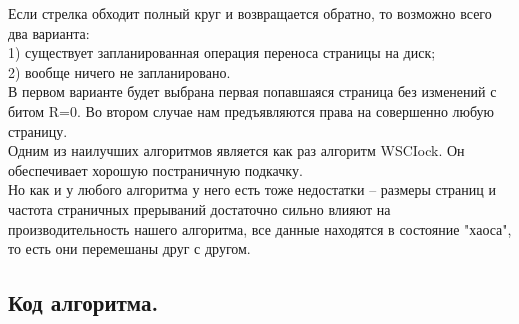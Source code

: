 Если стрелка обходит полный круг и возвращается обратно, то возможно всего два варианта: \\
1) существует запланированная операция переноса страницы на диск; \\
2) вообще ничего не запланировано. \\
В первом варианте будет выбрана первая попавшаяся страница без изменений с битом R=0. Во втором случае нам предъявляются права на совершенно любую страницу. \\
Одним из наилучших алгоритмов является как раз алгоритм WSCIock. Он обеспечивает хорошую постраничную подкачку.\\ 
Но как и у любого алгоритма у него есть тоже недостатки – размеры страниц и частота страничных прерываний достаточно сильно влияют на производительность нашего алгоритма, все данные находятся в состояние "хаоса", то есть они перемешаны друг с другом. 

\subsection{Код алгоритма.}







